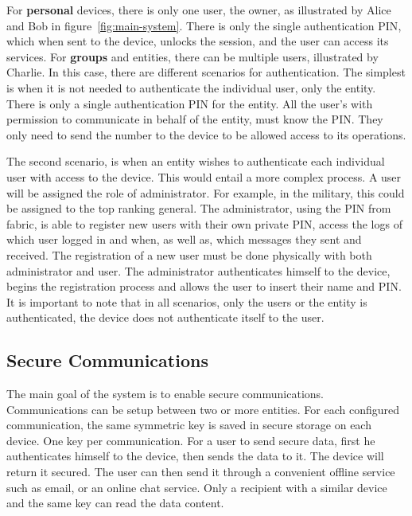 For \textbf{personal} devices, there is only one user, the owner, as illustrated by Alice and Bob in figure~\ref{fig:main-system}. There is only the single authentication \ac{PIN}, which when sent to the device, unlocks the session, and the user can access its services.
For \textbf{groups} and entities, there can be multiple users, illustrated by Charlie. In this case, there are different scenarios for authentication.
The simplest is when it is not needed to authenticate the individual user, only the entity. There is only a single authentication \ac{PIN} for the entity. All the user's with permission to communicate in behalf of the entity, must know the \ac{PIN}. They only need to send the number to the device to be allowed access to its operations.

The second scenario, is when an entity wishes to authenticate each individual user with access to the device. 
This would entail a more complex process. A user will be assigned the role of administrator. For example, in the military, this could be assigned to the top ranking general. The administrator, using the \ac{PIN} from fabric, is able to register new users with their own private \ac{PIN}, access the logs of which user logged in and when, as well as, which messages they sent and received.
The registration of a new user must be done physically with both administrator and user. The administrator authenticates himself to the device, begins the registration process and allows the user to insert their name and \ac{PIN}.
It is important to note that in all scenarios, only the users or the entity is authenticated, the device does not authenticate itself to the user.

\subsection{Secure Communications}\label{chap:problem:scenarios:comms}
The main goal of the system is to enable secure communications. Communications can be setup between two or more entities. For each configured communication, the same symmetric key is saved in secure storage on each device. One key per communication.
For a user to send secure data, first he authenticates himself to the device, then sends the data to it. The device will return it secured. The user can then send it through a convenient offline service such as email, or an online chat service. Only a recipient with a similar device and the same key can read the data content.

